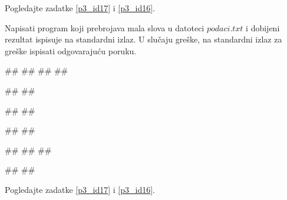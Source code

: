 \begin{Answer}[ref=p3_iv3]

Pogledajte zadatke \ref{p3_id17} i \ref{p3_id16}.
\end{Answer}


\begin{Exercise}[label=p3_01] 
Napisati program koji prebrojava mala slova u datoteci $podaci.txt$ i dobijeni rezultat ispisuje na
standardni izlaz.
U slučaju greške, na standardni izlaz za greške ispisati odgovarajuću poruku.

\begin{minitest}
\begin{upotreba}{1}
##
##
##
##

#\naslovIzlaz#
##
\end{upotreba}
\end{minitest}
\begin{minitest}
\begin{upotreba}{2}
##
##

#\naslovIzlaz#
##
\end{upotreba}
\end{minitest}
\begin{minitest}
\begin{upotreba}{3}
##
##
##

#\naslovIzlaz#
##
\end{upotreba}
\end{minitest}
\end{Exercise}
\begin{Answer}[ref=p3_01]

Pogledajte zadatke \ref{p3_id17} i \ref{p3_id16}.
\end{Answer}


